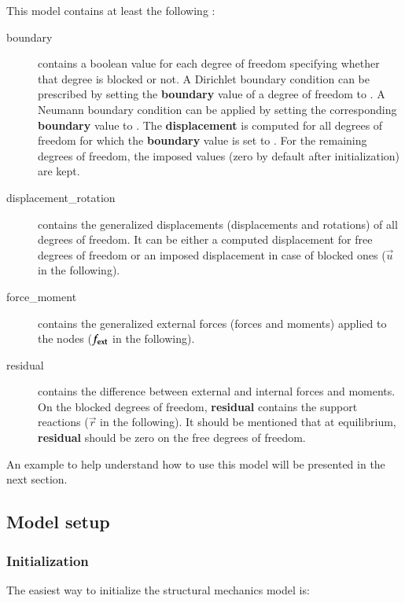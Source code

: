 \vspace{1cm}
This model contains at least the following :
\begin{description}
\item[boundary]  contains a  boolean  value for  each  degree of  freedom
  specifying  whether  that degree  is  blocked  or  not. A  Dirichlet  boundary
  condition can be prescribed by setting the \textbf{boundary} value of a degree
  of freedom to  .  A Neumann boundary condition  can  be applied
  by setting the corresponding  \textbf{boundary} value to  .
  The \textbf{displacement} is computed for all degrees of freedom for which the \textbf{boundary} value is set to . For the remaining degrees of freedom, the imposed values (zero by default after initialization) are kept.
  

  
\item[displacement\_rotation]  contains  the  generalized displacements (displacements and rotations)  of  all
  degrees of freedom. It can be  either a computed displacement for free degrees
  of freedom  or an imposed displacement  in case of blocked  ones ($\vec{u}$ in
  the following).
  
\item[force\_moment]  contains the  generalized external  forces (forces and moments) applied  to the
  nodes ($\boldsymbol{f_{{\mathrm{ext}}}}$ in the following).
  
\item[residual] contains the difference between external and internal forces and
  moments. On the blocked degrees of freedom, \textbf{residual} contains the support
  reactions   ($\vec{r}$ in  the following).   It should  be mentioned  that at
  equilibrium, \textbf{residual} should be zero on the free degrees of freedom.
\end{description}

An example to help understand how  to use this model will be presented in the
next section.

\subsection{Model setup}
\label{sec:structMechMod:setup}

\subsubsection{Initialization}
The easiest way to initialize the structural mechanics model is:
%  
%
%

